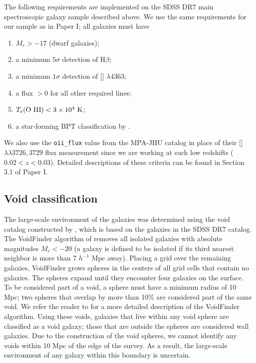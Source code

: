 The following requirements are implemented on the SDSS DR7 main spectroscopic 
galaxy sample described above.  We use the same requirements for our sample as 
in Paper I; all galaxies must have
\begin{enumerate}
    \item{$M_r > -17$ (dwarf galaxies);}
    \item{a minimum $5\sigma$ detection of H$\beta$;}
    \item{a minimum $1\sigma$ detection of [] $\lambda 4363$;}
    \item{a flux $>0$ for all other required lines;}
    \item{$T_e (\text{\ion{O}{3}}) < 3\times 10^4 \text{ K}$;}
    \item{a star-forming BPT classification by \cite{Brinchmann04}.}
\end{enumerate}
We also use the \texttt{oii\_flux} value from the MPA-JHU catalog in place of 
their [] $\lambda \lambda 3726, 3729$ flux measurement since we are 
working at such low redshifts ($0.02 < z < 0.03$).  Detailed descriptions of 
these criteria can be found in Section 3.1 of Paper I.


\subsection{Void classification}

The large-scale environment of the galaxies was determined using the void 
catalog constructed by \cite{Pan12}, which is based on the galaxies in the SDSS 
DR7 catalog.  The VoidFinder algorithm of \cite{Hoyle02} removes all isolated 
galaxies with absolute magnitudes $M_r < -20$ (a galaxy is defined to be 
isolated if its third nearest neighbor is more than 7 $h^{-1}$ Mpc away).  
Placing a grid over the remaining galaxies, VoidFinder grows spheres in the 
centers of all grid cells that contain no galaxies.  The spheres expand until 
they encounter four galaxies on the surface.  To be considered part of a void, a 
sphere must have a minimum radius of 10 Mpc; two spheres that overlap by more 
than 10\% are considered part of the same void.  We refer the reader to 
\cite{Hoyle02} for a more detailed description of the VoidFinder algorithm.  
Using these voids, galaxies that live within any void sphere are classified as 
a void galaxy; those that are outside the spheres are considered wall galaxies.  
Due to the construction of the void spheres, we cannot identify any voids within 
10 Mpc of the edge of the survey.  As a result, the large-scale environment of 
any galaxy within this boundary is uncertain.

